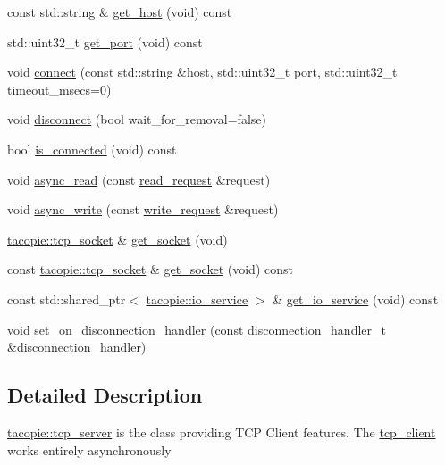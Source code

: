 \begin{DoxyCompactItemize}
const std\+::string \& \hyperlink{classtacopie_1_1tcp__client_ad38ab710c5eca64de2f887abc455b15d}{get\+\_\+host} (void) const
\item 
std\+::uint32\+\_\+t \hyperlink{classtacopie_1_1tcp__client_a3b42ae2afe6d5ee5f2f16b8bd7846f37}{get\+\_\+port} (void) const
\item 
void \hyperlink{classtacopie_1_1tcp__client_a0cfbb18cb72aa3b6a41921f61cacc425}{connect} (const std\+::string \&host, std\+::uint32\+\_\+t port, std\+::uint32\+\_\+t timeout\+\_\+msecs=0)
\item 
void \hyperlink{classtacopie_1_1tcp__client_a7562e0bfa24912595d6f695f848b9e51}{disconnect} (bool wait\+\_\+for\+\_\+removal=false)
\item 
bool \hyperlink{classtacopie_1_1tcp__client_a9bf568812c8350260843842e7952c8c3}{is\+\_\+connected} (void) const
\item 
void \hyperlink{classtacopie_1_1tcp__client_a120e3ec2902acc902f7a0b27074bda6b}{async\+\_\+read} (const \hyperlink{structtacopie_1_1tcp__client_1_1read__request}{read\+\_\+request} \&request)
\item 
void \hyperlink{classtacopie_1_1tcp__client_a2304ed6d4ca0cbc74e6aa72d3e92b76a}{async\+\_\+write} (const \hyperlink{structtacopie_1_1tcp__client_1_1write__request}{write\+\_\+request} \&request)
\item 
\hyperlink{classtacopie_1_1tcp__socket}{tacopie\+::tcp\+\_\+socket} \& \hyperlink{classtacopie_1_1tcp__client_a1a3834deb1d263ec5816066f74286298}{get\+\_\+socket} (void)
\item 
const \hyperlink{classtacopie_1_1tcp__socket}{tacopie\+::tcp\+\_\+socket} \& \hyperlink{classtacopie_1_1tcp__client_a9cf1f3ccf43f9a0a883a17b15e3668d6}{get\+\_\+socket} (void) const
\item 
const std\+::shared\+\_\+ptr$<$ \hyperlink{classtacopie_1_1io__service}{tacopie\+::io\+\_\+service} $>$ \& \hyperlink{classtacopie_1_1tcp__client_aafbf0aa37cd0472778d09fb163362314}{get\+\_\+io\+\_\+service} (void) const
\item 
void \hyperlink{classtacopie_1_1tcp__client_a8c290d681186edb0578051c04f3c0762}{set\+\_\+on\+\_\+disconnection\+\_\+handler} (const \hyperlink{classtacopie_1_1tcp__client_aca5df52e5ee6fa673cf212532ada1453}{disconnection\+\_\+handler\+\_\+t} \&disconnection\+\_\+handler)
\end{DoxyCompactItemize}


\subsection{Detailed Description}
\hyperlink{classtacopie_1_1tcp__server}{tacopie\+::tcp\+\_\+server} is the class providing T\+CP Client features. The \hyperlink{classtacopie_1_1tcp__client}{tcp\+\_\+client} works entirely asynchronously 

